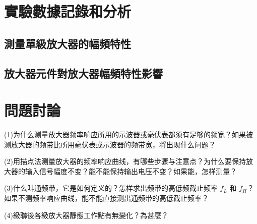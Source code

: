 \documentclass[a4paper]{article}
\begin{document}
\section{實驗數據記錄和分析}
\subsection{測量單級放大器的幅頻特性}
\subsection{放大器元件對放大器幅頻特性影響}
\section{問題討論}
\hspace{2em}(1)为什么测量放大器频率响应所用的示波器或毫伏表都须有足够的频宽？如果被测放大器的频带比所用毫伏表或示波器的频带宽，将出现什么问题？\par
\hspace{2em}(2)用描点法测量放大器的频率响应曲线，有哪些步骤与注意点？为什么要保持放大器的输入信号幅度不变？能不能保持输出电压不变？如果能，怎样测量？\par
\hspace{2em}(3)什么叫通频带，它是如何定义的？怎样求出频带的高低频截止频率 $f_L$ 和 $f_H$？如果不测频率响应曲线，能不能直接测出通频带的高低截止频率？\par
\hspace{2em}(4)級聯後各級放大器靜態工作點有無變化？為甚麼？\par
\end{document}
